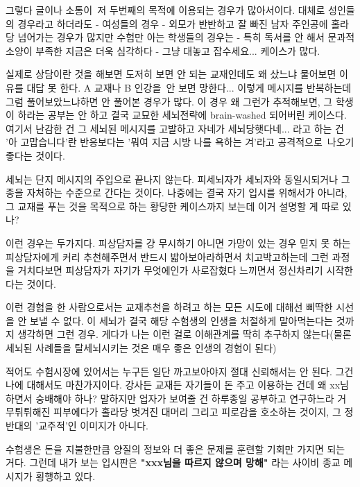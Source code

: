 그렇다 글이나 소통이 저 두번째의 목적에 이용되는 경우가 많아서이다.
대체로 성인들의 경우라고 하더라도 - 여성들의 경우 - 외모가 반반하고 잘 빠진 남자 주인공에 홀라당 넘어가는 경우가 많지만
수험만 아는 학생들의 경우는 - 특히 독서를 안 해서 문과적 소양이 부족한 지금은 더욱 심각하다 - 그냥 대놓고 잡수세요... 케이스가 많다.
\vspace{5mm}

실제로 상담이란 것을 해보면 도저히 보면 안 되는 교재인데도 왜 샀느냐 물어보면 이유를 대답 못 한다.
A 교재나 B 인강을 안 보면 망한다... 이렇게 메시지를 반복하는데 그럼 풀어보았느냐하면 안 풀어본 경우가 많다.
이 경우 왜 그런가 추적해보면, 그 학생이 하라는 공부는 안 하고 결국 교묘한 세뇌전략에 brain-washed 되어버린 케이스다.
여기서 난감한 건 그 세뇌된 메시지를 고발하고 자네가 세뇌당햇다네... 라고 하는 건 '아 고맙습니다'란 반응보다는
'뭐여 지금 시방 나를 욕하는 겨'라고 공격적으로 나오기 좋다는 것이다.
\vspace{5mm}

세뇌는 단지 메시지의 주입으로 끝나지 않는다. 피세뇌자가 세뇌자와 동일시되거나 그 종을 자처하는 수준으로 간다는 것이다.
나중에는 결국 자기 입시를 위해서가 아니라, 그 교재를 푸는 것을 목적으로 하는 황당한 케이스까지 보는데 이거 설명할 게 따로 있나?
\vspace{5mm}

이런 경우는 두가지다. 피상담자를 걍 무시하기
아니면 가망이 있는 경우 믿지 못 하는 피상담자에게 커리 추천해주면서 반드시 밟아보아라하면서
치고박고하는데 그런 과정을 거치다보면 피상담자가 자기가 무엇에인가 사로잡혔다 느끼면서 정신차리기 시작한다는 것이다.
\vspace{5mm}

이런 경험을 한 사람으로서는 교재추천을 하려고 하는 모든 시도에 대해선 삐딱한 시선을 안 보낼 수 없다.
이 세뇌가 결국 해당 수험생의 인생을 처절하게 말아먹는다는 것까지 생각하면 그런 경우.
게다가 나는 이런 걸로 이해관계를 딱히 추구하지 않는다(물론 세뇌된 사례들을 탈세뇌시키는 것은 매우 좋은 인생의 경험이 된다)
\vspace{5mm}

적어도 수험시장에 있어서는 누구든 일단 까고보아야지 절대 신뢰해서는 안 된다. 그건 나에 대해서도 마찬가지이다.
강사든 교재든 자기들이 돈 주고 이용하는 건데 왜 xx님 하면서 숭배해야 하나?
말하지만 업자가 보여줄 건 하루종일 공부하고 연구하느라 거무튀튀해진 피부에다가 홀라당 벗겨진 대머리
그리고 피로감을 호소하는 것이지, 그 정반대의 '교주적'인 이미지가 아니다.
\vspace{5mm}

수험생은 돈을 지불한만큼 양질의 정보와 더 좋은 문제를 훈련할 기회만 가지면 되는 거다.
그런데 내가 보는 입시판은 \textbf{"xxx님을 따르지 않으며 망해"} 라는 사이비 종교 메시지가 횡행하고 있다.
\vspace{5mm}








